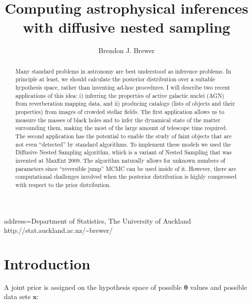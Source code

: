 \documentclass[
    ,final            %
  ]
  {aipproc}
\newcommand{\pars}{\boldsymbol{\theta}}
\newcommand{\data}{\mathbf{x}}
\begin{document}
\title{Computing astrophysical inferences with diffusive nested sampling}


\author{Brendon J. Brewer}{
  address={Department of Statistics, The University of Auckland\\
http://stat.auckland.ac.nz/\~{ }brewer/}
}


\begin{abstract}
Many standard problems in astronomy are best understood as inference problems.
In principle at least,
we should calculate the posterior distribution over a suitable hypothesis space,
rather than inventing ad-hoc procedures. I will describe two recent applications
of this idea: i) inferring the properties of active galactic nuclei (AGN)
from reverberation mapping data, and ii) producing catalogs (lists of objects
and their properties) from images of
crowded stellar fields. The first application allows us to measure the masses
of black holes and to infer the dynamical state of the matter surrounding them,
making the most of the large amount of telescope time required. The second
application has the potential to enable the study of faint objects that are not
even ``detected'' by standard algorithms.
To implement these models we used the Diffusive Nested Sampling algorithm,
which is a variant of Nested Sampling that was invented at MaxEnt 2009. The
algorithm naturally allows for unknown numbers of parameters since
``reversible jump'' MCMC can be used inside of it. However, there are
computational challenges involved when the posterior distribution is highly
compressed with respect to the prior distribution.
\end{abstract}

\maketitle


\section{Introduction}

A joint prior is assigned on the hypothesis space of possible $\pars$ values
and possible data sets $\data$:
\end{document}
